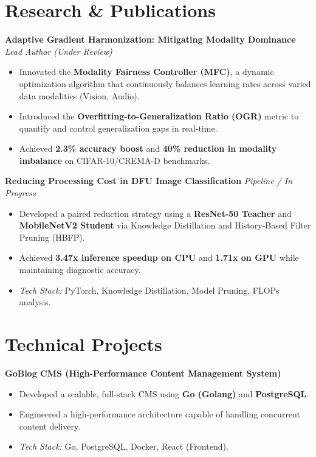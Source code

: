 \documentclass[a4paper,10pt]{article}
\newcommand{\proj}[2]{
  \noindent\textbf{#1} \hfill \textit{#2}
}
\begin{document}
\vspace{5pt}

\section{Research \& Publications}

\noindent\textbf{Adaptive Gradient Harmonization: Mitigating Modality Dominance} \hfill \textit{Lead Author (Under Review)}
\begin{itemize}[noitemsep,topsep=2pt,leftmargin=15pt]
    \item Innovated the \textbf{Modality Fairness Controller (MFC)}, a dynamic optimization algorithm that continuously balances learning rates across varied data modalities (Vision, Audio).
    \item Introduced the \textbf{Overfitting-to-Generalization Ratio (OGR)} metric to quantify and control generalization gaps in real-time.
    \item Achieved \textbf{2.3\% accuracy boost} and \textbf{40\% reduction in modality imbalance} on CIFAR-10/CREMA-D benchmarks.
\end{itemize}

\vspace{5pt}

\noindent\textbf{Reducing Processing Cost in DFU Image Classification} \hfill \textit{Pipeline / In Progress}
\begin{itemize}[noitemsep,topsep=2pt,leftmargin=15pt]
    \item Developed a paired reduction strategy using a \textbf{ResNet-50 Teacher} and \textbf{MobileNetV2 Student} via Knowledge Distillation and History-Based Filter Pruning (HBFP).
    \item Achieved \textbf{3.47x inference speedup on CPU} and \textbf{1.71x on GPU} while maintaining diagnostic accuracy.
    \item \textit{Tech Stack:} PyTorch, Knowledge Distillation, Model Pruning, FLOPs analysis.
\end{itemize}

\section{Technical Projects}

\proj{GoBlog CMS (High-Performance Content Management System)}{}
\begin{itemize}[noitemsep,topsep=2pt,leftmargin=15pt]
    \item Developed a scalable, full-stack CMS using \textbf{Go (Golang)} and \textbf{PostgreSQL}.
    \item Engineered a high-performance architecture capable of handling concurrent content delivery.
    \item \textit{Tech Stack:} Go, PostgreSQL, Docker, React (Frontend).
\end{itemize}
\end{document}

